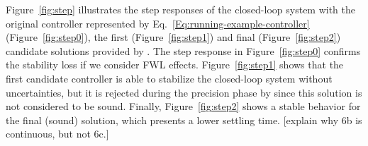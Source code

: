 \documentclass[final]{sig-alternate-05-2015}
\newcommand{\blue}[1]{{\color{blue}#1}}
\begin{document}
Figure~\ref{fig:step} illustrates the step responses of the closed-loop
system with the original controller represented by
Eq.~\eqref{Eq:running-example-controller} (Figure~\ref{fig:step0}), the
first (Figure~\ref{fig:step1}) and final (Figure~\ref{fig:step2}) candidate
solutions provided by \tool.  The step response in Figure~\ref{fig:step0}
confirms the stability loss if we consider FWL effects.  
Figure~\ref{fig:step1} shows that the first candidate controller is able to
stabilize the closed-loop system without uncertainties, but it is rejected
during the {\sc precision} phase by \tool since this solution is not
considered to be sound.  Finally, Figure~\ref{fig:step2} shows a stable
behavior for the final (sound) solution, which presents a lower settling
time. 
\blue{[explain why 6b is continuous, but not 6c.]}
\end{document}
